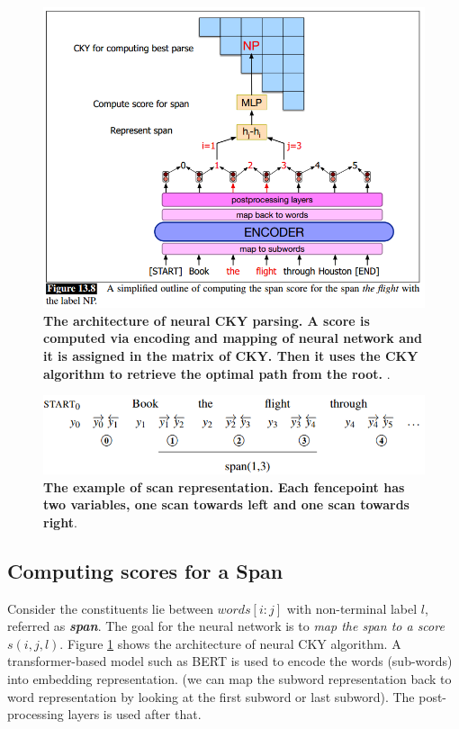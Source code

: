 \documentclass[11pt]{article}
\begin{document}
\begin{figure}
\begin{minipage}[t]{1\linewidth}
  \centering
  \centerline{\includegraphics[scale = 0.5]{neural_cky.png}}
\end{minipage}
\caption{\footnotesize{\textbf{The architecture of neural CKY parsing. A score is computed via encoding and mapping of neural network and it is assigned in the matrix of CKY. Then it uses the CKY algorithm to retrieve the optimal path from the root. }.}}
\label{fig: bert_cky_parse}
\end{figure}
\begin{figure}
\begin{minipage}[t]{1\linewidth}
  \centering
  \centerline{\includegraphics[scale = 0.5]{scan_repr.png}}
\end{minipage}
\caption{\footnotesize{\textbf{The example of scan representation. Each fencepoint has two variables, one scan towards left and one scan towards right}.}}
\label{fig: scan_example}
\end{figure}

\subsection{Computing scores for a Span}
Consider the constituents lie between $words[i:j]$ with non-terminal label $l$, referred as \textbf{\emph{span}}. The goal for the neural network is to \emph{map the span to a score $s(i,j,l)$}. Figure \ref{fig: bert_cky_parse} shows the architecture of neural CKY algorithm. A transformer-based model such as BERT is used to encode the words (sub-words) into embedding representation. (we can map the subword representation back to word representation by looking at the first subword or last subword). The post-processing layers is used after that.
\end{document}
